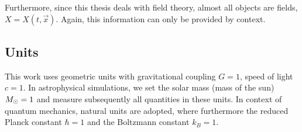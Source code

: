Furthermore, since this thesis deals with field theory, almost all
objects are fields, \ie $X=X(t,\vec x)$. Again, this information
can only be provided by context.

\subsection{Units}
This work uses geometric units with gravitational coupling $G=1$, speed of light $c=1$.
In astrophysical simulations, we set the solar mass (mass of the sun) $M_{\odot}=1$ 
and measure subsequently all quantities
in these units. In context of quantum mechanics, natural units are adopted,
where furthermore the reduced Planck constant $\hbar=1$ and the Boltzmann
constant $k_B=1$.


